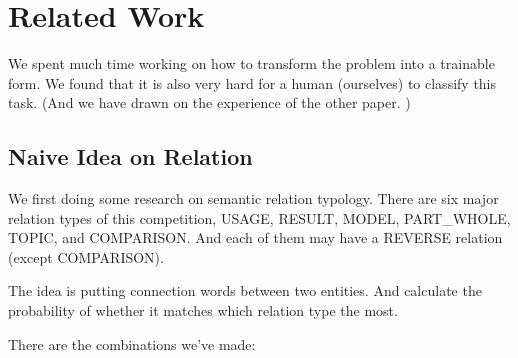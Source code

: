 \section{Related Work}
\label{sec:related_work}

We spent much time working on how to transform the problem into a trainable form. We found that it is also very hard for a human (ourselves) to classify this task.
(And we have drawn on the experience of the other paper. )

\subsection{Naive Idea on Relation}
\label{sec:naive_idea_on_relation}

We first doing some research on semantic relation typology. There are six major relation types of this competition, USAGE, RESULT, MODEL, PART\_WHOLE, TOPIC, and COMPARISON. And each of them may have a REVERSE relation (except COMPARISON).

The idea is putting connection words between two entities. And calculate the probability of whether it matches which relation type the most.

There are the combinations we've made:

